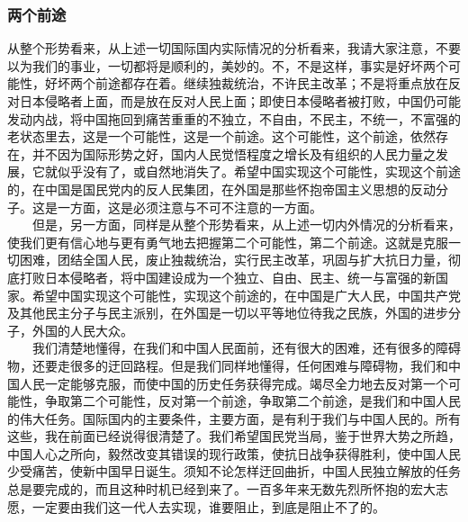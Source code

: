 \documentclass[cn,11pt,chinese]{elegantbook}
\def\myformat#1{\hfil\hfil #1}
\begin{document}
\subsubsection*{\myformat{两个前途}}
从整个形势看来，从上述一切国际国内实际情况的分析看来，我请大家注意，不要以为我们的事业，一切都将是顺利的，美妙的。不，不是这样，事实是好坏两个可能性，好坏两个前途都存在着。继续独裁统治，不许民主改革；不是将重点放在反对日本侵略者上面，而是放在反对人民上面；即使日本侵略者被打败，中国仍可能发动内战，将中国拖回到痛苦重重的不独立，不自由，不民主，不统一，不富强的老状态里去，这是一个可能性，这是一个前途。这个可能性，这个前途，依然存在，并不因为国际形势之好，国内人民觉悟程度之增长及有组织的人民力量之发展，它就似乎没有了，或自然地消失了。希望中国实现这个可能性，实现这个前途的，在中国是国民党内的反人民集团，在外国是那些怀抱帝国主义思想的反动分子。这是一方面，这是必须注意与不可不注意的一方面。\\
　　但是，另一方面，同样是从整个形势看来，从上述一切内外情况的分析看来，使我们更有信心地与更有勇气地去把握第二个可能性，第二个前途。这就是克服一切困难，团结全国人民，废止独裁统治，实行民主改革，巩固与扩大抗日力量，彻底打败日本侵略者，将中国建设成为一个独立、自由、民主、统一与富强的新国家。希望中国实现这个可能性，实现这个前途的，在中国是广大人民，中国共产党及其他民主分子与民主派别，在外国是一切以平等地位待我之民族，外国的进步分子，外国的人民大众。\\
　　我们清楚地懂得，在我们和中国人民面前，还有很大的困难，还有很多的障碍物，还要走很多的迂回路程。但是我们同样地懂得，任何困难与障碍物，我们和中国人民一定能够克服，而使中国的历史任务获得完成。竭尽全力地去反对第一个可能性，争取第二个可能性，反对第一个前途，争取第二个前途，是我们和中国人民的伟大任务。国际国内的主要条件，主要方面，是有利于我们与中国人民的。所有这些，我在前面已经说得很清楚了。我们希望国民党当局，鉴于世界大势之所趋，中国人心之所向，毅然改变其错误的现行政策，使抗日战争获得胜利，使中国人民少受痛苦，使新中国早日诞生。须知不论怎样迂回曲折，中国人民独立解放的任务总是要完成的，而且这种时机已经到来了。一百多年来无数先烈所怀抱的宏大志愿，一定要由我们这一代人去实现，谁要阻止，到底是阻止不了的。\\
\end{document}
